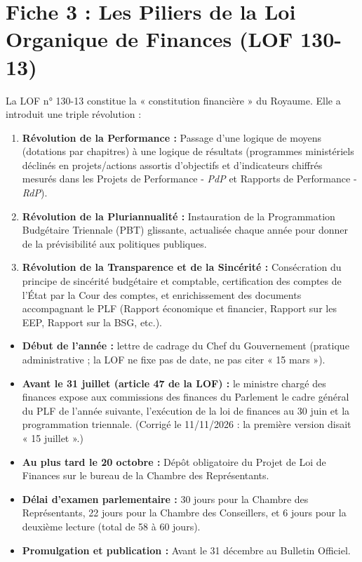 \section{Fiche 3 : Les Piliers de la Loi Organique de Finances (LOF 130-13)}

La LOF n° 130-13 constitue la « constitution financière » du Royaume. Elle a introduit une triple révolution :
\begin{enumerate}
    \item \textbf{Révolution de la Performance :} Passage d'une logique de moyens (dotations par chapitres) à une logique de résultats (programmes ministériels déclinés en projets/actions assortis d'objectifs et d'indicateurs chiffrés mesurés dans les Projets de Performance - \textit{PdP} et Rapports de Performance - \textit{RdP}).
    \item \textbf{Révolution de la Pluriannualité :} Instauration de la Programmation Budgétaire Triennale (PBT) glissante, actualisée chaque année pour donner de la prévisibilité aux politiques publiques.
    \item \textbf{Révolution de la Transparence et de la Sincérité :} Consécration du principe de sincérité budgétaire et comptable, certification des comptes de l'État par la Cour des comptes, et enrichissement des documents accompagnant le PLF (Rapport économique et financier, Rapport sur les EEP, Rapport sur la BSG, etc.).
\end{enumerate}

\begin{tcolorbox}[colback=yellow!5!white,colframe=orange!75!black,title=\textbf{Le Calendrier Budgétaire Constitutionnel (Dates à Retenir Par Cœur)}]
\begin{itemize}
    \item \textbf{Début de l'année :} lettre de cadrage du Chef du Gouvernement (pratique administrative ; la LOF ne fixe pas de date, ne pas citer « 15 mars »).
    \item \textbf{Avant le 31 juillet (article 47 de la LOF) :} le ministre chargé des finances expose aux commissions des finances du Parlement le cadre général du PLF de l'année suivante, l'exécution de la loi de finances au 30 juin et la programmation triennale. (Corrigé le 11/11/2026 : la première version disait « 15 juillet ».)
    \item \textbf{Au plus tard le 20 octobre :} Dépôt obligatoire du Projet de Loi de Finances sur le bureau de la Chambre des Représentants.
    \item \textbf{Délai d'examen parlementaire :} 30 jours pour la Chambre des Représentants, 22 jours pour la Chambre des Conseillers, et 6 jours pour la deuxième lecture (total de 58 à 60 jours).
    \item \textbf{Promulgation et publication :} Avant le 31 décembre au Bulletin Officiel.
\end{itemize}
\end{tcolorbox}

